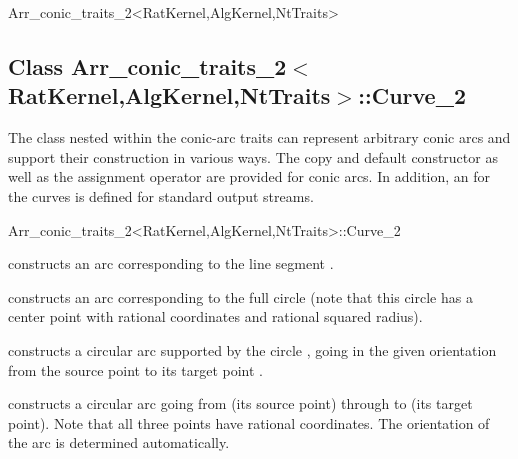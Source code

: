 \begin{ccRefClass}{Arr_conic_traits_2<RatKernel,AlgKernel,NtTraits>}
\ccTypes



\subsection*{Class 
        Arr\_conic\_traits\_2$<$RatKernel,AlgKernel,NtTraits$>$::Curve\_2}

The  class nested within the conic-arc traits can represent
arbitrary conic arcs and support their construction in various ways.
The copy and default constructor as well as the assignment operator are
provided for conic arcs. In addition, an 
for the curves is defined for standard output streams.

\begin{ccClass}{Arr_conic_traits_2<RatKernel,AlgKernel,NtTraits>::Curve_2}

\ccCreation
{}

    {constructs an arc corresponding to the line segment .}

    {constructs an arc corresponding to the full circle 
     (note that this circle has a center point with rational coordinates
     and rational squared radius).}

    {constructs a circular arc supported by the circle , going
     in the given orientation  from the source point  to
     its target point .
     }

    {constructs a circular arc going from  (its source point)
     through  to  (its target point). Note that all three
     points have rational coordinates. The orientation of the arc is
     determined automatically.
     }


\end{ccClass}
\end{ccRefClass}
